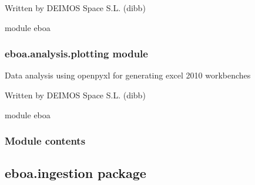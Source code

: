 Written by DEIMOS Space S.L. (dibb)

module eboa

\begin{fulllineitems}
\label{\detokenize{eboa.analysis:eboa.analysis.functions.adjust_column_width}}
\end{fulllineitems}



\subsubsection{eboa.analysis.plotting module}
\label{\detokenize{eboa.analysis:module-eboa.analysis.plotting}}\label{\detokenize{eboa.analysis:eboa-analysis-plotting-module}}
Data analysis using openpyxl for generating excel 2010 workbenches

Written by DEIMOS Space S.L. (dibb)

module eboa

\begin{fulllineitems}
\label{\detokenize{eboa.analysis:eboa.analysis.plotting.generate_gantt}}
\end{fulllineitems}



\subsubsection{Module contents}
\label{\detokenize{eboa.analysis:module-eboa.analysis}}\label{\detokenize{eboa.analysis:module-contents}}

\subsection{eboa.ingestion package}
\label{\detokenize{eboa.ingestion:eboa-ingestion-package}}\label{\detokenize{eboa.ingestion::doc}}

